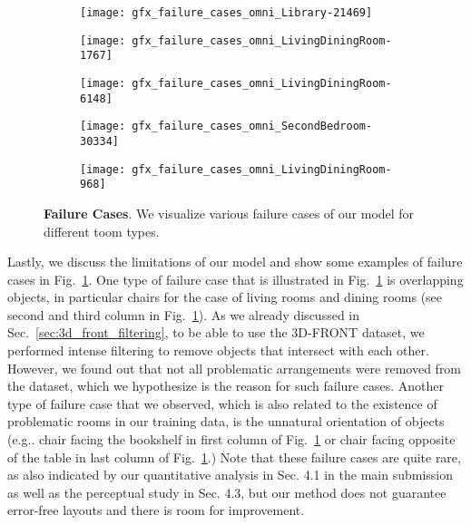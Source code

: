 \documentclass{article}
\makeatletter
\DeclareRobustCommand\onedot{\futurelet\@let@token\@onedot}
\def\@onedot{\ifx\@let@token.\else.\null\fi\xspace}
\def\eg{e.g\onedot} \def\Eg{E.g\onedot}
\newcommand{\figref}[1]{Fig.~\ref{#1}}
\newcommand{\secref}[1]{Sec.~\ref{#1}}
\makeatother
\begin{document}
\begin{figure}[!h]
    \centering
    \hfill \begin{subfigure}[b]{0.20\linewidth}
		\centering
		\texttt{[image: gfx\_failure\_cases\_omni\_Library-21469]}
    \end{subfigure}\begin{subfigure}[b]{0.20\linewidth}
		\centering
		\texttt{[image: gfx\_failure\_cases\_omni\_LivingDiningRoom-1767]}
    \end{subfigure}\begin{subfigure}[b]{0.20\linewidth}
		\centering
		\texttt{[image: gfx\_failure\_cases\_omni\_LivingDiningRoom-6148]}
    \end{subfigure}\begin{subfigure}[b]{0.20\linewidth}
		\centering
		\texttt{[image: gfx\_failure\_cases\_omni\_SecondBedroom-30334]}
    \end{subfigure}\begin{subfigure}[b]{0.20\linewidth}
		\centering
		\texttt{[image: gfx\_failure\_cases\_omni\_LivingDiningRoom-968]}
    \end{subfigure}\vspace{-1.2em}
    \hfill \caption{{\bf Failure Cases}. We visualize various failure cases of
    our model for different toom types.}
    \label{fig:failure_cases}
\end{figure}


Lastly, we discuss the limitations of our model and show some examples of
failure cases in \figref{fig:failure_cases}. One type of failure case that is
illustrated in \figref{fig:failure_cases} is overlapping objects, in
particular chairs for the case of living rooms and dining rooms (see second and
third column in \figref{fig:failure_cases}). As we already discussed in
\secref{sec:3d_front_filtering}, to be able to use the 3D-FRONT dataset, we
performed intense filtering to remove objects that intersect with each other.
However, we found out that not all problematic arrangements were removed from
the dataset, which we hypothesize is the reason for such failure cases. Another type of failure case
that we observed, which is also related to the existence of problematic rooms
in our training data, is the unnatural orientation of objects (\eg chair facing
the bookshelf in first column of \figref{fig:failure_cases} or chair facing
opposite of the table in last column of \figref{fig:failure_cases}.) Note that
these failure cases are quite rare, as also indicated by our quantitative
analysis in Sec. 4.1 in the main submission as well as the perceptual study in
Sec. 4.3, but our method does not guarantee error-free layouts and there is room for improvement.
\end{document}
